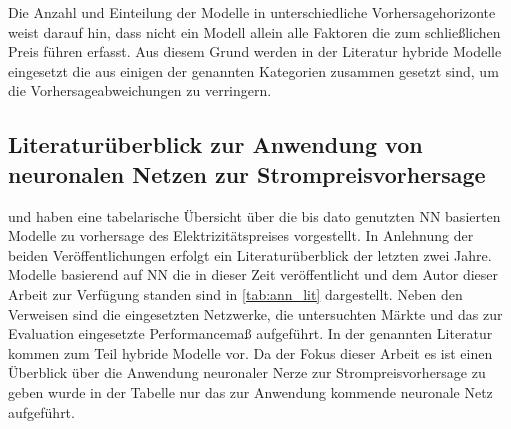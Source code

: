 Die Anzahl und Einteilung der Modelle in unterschiedliche Vorhersagehorizonte weist darauf hin, dass nicht ein Modell allein alle Faktoren die zum schließlichen Preis führen erfasst. Aus diesem Grund werden in der Literatur hybride Modelle eingesetzt die aus einigen der genannten Kategorien zusammen gesetzt sind, um die Vorhersageabweichungen zu verringern.


\subsection{Literaturüberblick zur Anwendung von neuronalen Netzen zur Strompreisvorhersage}

\citet{Aggarwal2009} und \citet{Panapakidis2016} haben eine tabelarische Übersicht über die bis dato genutzten NN basierten Modelle zu vorhersage des Elektrizitätspreises vorgestellt. In Anlehnung der beiden Veröffentlichungen erfolgt ein Literaturüberblick der letzten zwei Jahre. 
Modelle basierend auf NN die in dieser Zeit veröffentlicht und dem Autor dieser Arbeit zur Verfügung standen sind in \autoref{tab:ann_lit} dargestellt. Neben den Verweisen sind die eingesetzten Netzwerke, die untersuchten Märkte und das zur Evaluation eingesetzte Performancemaß aufgeführt. In der genannten Literatur kommen zum Teil hybride Modelle vor. Da der Fokus dieser Arbeit es ist einen Überblick über die Anwendung neuronaler Nerze zur Strompreisvorhersage zu geben wurde in der Tabelle nur das zur Anwendung kommende neuronale Netz aufgeführt. 






